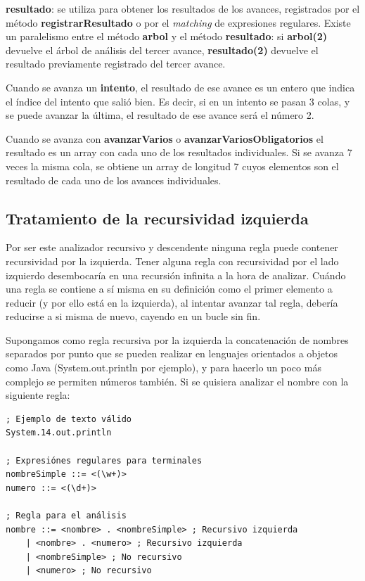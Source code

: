 \documentclass{report}
\begin{document}
	\vspace{10px}
	\noindent
	\textbf{resultado}: se utiliza para obtener los resultados de los avances, registrados por el método \textbf{registrarResultado} o por el \textit{matching} de expresiones regulares. Existe un paralelismo entre el método \textbf{arbol} y el método \textbf{resultado}: si \textbf{arbol(2)} devuelve el árbol de análisis del tercer avance, \textbf{resultado(2)} devuelve el resultado previamente registrado del tercer avance.

	\vspace{10px}
	
	Cuando se avanza un \textbf{intento}, el resultado de ese avance es un entero que indica el índice del intento que salió bien. Es decir, si en un intento se pasan 3 colas, y se puede avanzar la última, el resultado de ese avance será el número 2. 
	
	\vspace{10px}
	
	Cuando se avanza con \textbf{avanzarVarios} o \textbf{avanzarVariosObligatorios} el resultado es un array con cada uno de los resultados individuales. Si se avanza 7 veces la misma cola, se obtiene un array de longitud 7 cuyos elementos son el resultado de cada uno de los avances individuales. 
	

	\subsection{Tratamiento de la recursividad izquierda}
	
	Por ser este analizador recursivo y descendente ninguna regla puede contener recursividad por la izquierda. Tener alguna regla con recursividad por el lado izquierdo desembocaría en una recursión infinita a la hora de analizar. Cuándo una regla se contiene a sí misma en su definición como el primer elemento a reducir (y por ello está en la izquierda), al intentar avanzar tal regla, debería reducirse a si misma de nuevo, cayendo en un bucle sin fin.
	
	Supongamos como regla recursiva por la izquierda la concatenación de nombres separados por punto que se pueden realizar en lenguajes orientados a objetos como Java (System.out.println por ejemplo), y para hacerlo un poco más complejo se permiten números también. Si se quisiera analizar el nombre con la siguiente regla:
	
	
\begin{BVerbatim}
; Ejemplo de texto válido 
System.14.out.println

; Expresiónes regulares para terminales
nombreSimple ::= <(\w+)>
numero ::= <(\d+)>

; Regla para el análisis
nombre ::= <nombre> . <nombreSimple> ; Recursivo izquierda
	| <nombre> . <numero> ; Recursivo izquierda
	| <nombreSimple> ; No recursivo
	| <numero> ; No recursivo
\end{BVerbatim}	
\end{document}
